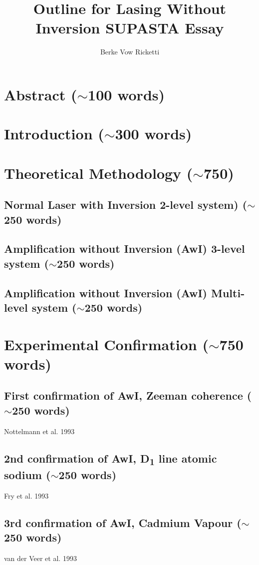 \documentclass{article}
\title{Outline for Lasing Without Inversion SUPASTA Essay}
\author{Berke Vow Ricketti}
\begin{document}
\maketitle{}




\section{Abstract ($\sim$100 words)}

\section{Introduction ($\sim$300 words)}
\cite{Harris1989,Scully1994,Kocharovskaya1986,Mandel1993,Kilin2008,Ukhanov1999,Zhu1992,Marthaler2011,Mompart2000}
\section{Theoretical Methodology ($\sim$750)}
\subsection{Normal Laser with Inversion 2-level system) ($\sim$250 words)}
\subsection{Amplification without Inversion (AwI) 3-level system ($\sim$250 words)}
\subsection{Amplification without Inversion (AwI) Multi-level system ($\sim$250 words)}

\section{Experimental Confirmation ($\sim$750 words)}
\subsection{First confirmation of AwI, Zeeman coherence ($\sim$250 words)}
Nottelmann et al. 1993 \cite{Nottelmann1993}
\subsection{2nd confirmation of AwI, D\textsubscript{1} line atomic sodium ($\sim$250 words)}
Fry et al. 1993 \cite{PhysRevLett.70.3235}
\subsection{3rd confirmation of AwI, Cadmium Vapour ($\sim$250 words)}
van der Veer et al. 1993 \cite{PhysRevLett.70.3243}
\end{document}
